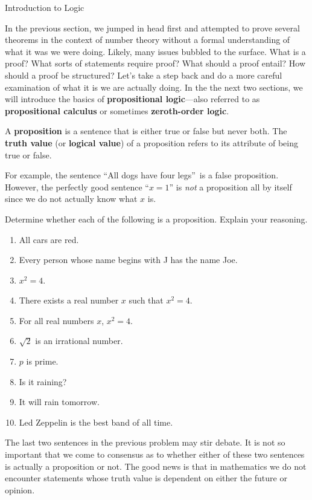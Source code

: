 \begin{section}{Introduction to Logic}\label{sec:Intro_to_Logic}

In the previous section, we jumped in head first and attempted to prove several theorems in the context of number theory without a formal understanding of what it was we were doing. Likely, many issues bubbled to the surface. What is a proof? What sorts of statements require proof? What should a proof entail?  How should a proof be structured? Let's take a step back and do a more careful examination of what it is we are actually doing. In the the next two sections, we will introduce the basics of \textbf{propositional logic}---also referred to as \textbf{propositional calculus} or sometimes \textbf{zeroth-order logic}.

\begin{definition}
A \textbf{proposition} is a sentence that is either true or false but never both. The \textbf{truth value} (or \textbf{logical value}) of a proposition refers to its attribute of being true or false.
\end{definition}

For example, the sentence ``All dogs have four legs''~is a false proposition.  However, the perfectly good sentence ``$x=1$'' is \emph{not} a proposition all by itself since we do not actually know what $x$ is.

\begin{problem} Determine whether each of the following is a proposition. Explain your reasoning.
\begin{enumerate}[label=\textrm{(\alph*)}]
\item All cars are red.
\item Every person whose name begins with J has the name Joe.
\item $x^2=4$.
\item There exists a real number $x$ such that $x^2=4$.
\item For all real numbers $x$, $x^2=4$.
\item $\sqrt{2}$ is an irrational number.
\item $p$ is prime.
\item Is it raining?
\item It will rain tomorrow.
\item Led Zeppelin is the best band of all time.
\end{enumerate}
\end{problem}

The last two sentences in the previous problem may stir debate. It is not so important that we come to consensus as to whether either of these two sentences is actually a proposition or not. The good news is that in mathematics we do not encounter statements whose truth value is dependent on either the future or opinion.


\end{section}
